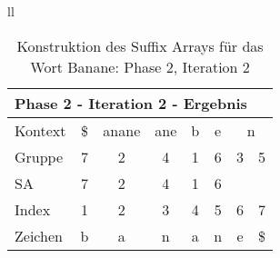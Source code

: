 \begin{table}[H]
\begin{adjustbox}{max width=\textwidth}
\begin{tabular}{ll}
\begin{tabular}{lccccccc}
\multicolumn{8}{l}{Phase 2 - Iteration 2 - Ergebnis}                                                                                                                                                             \\ \hline
\multicolumn{1}{l|}{Kontext} & \multicolumn{1}{c|}{\$} & \multicolumn{1}{c|}{anane} & \multicolumn{1}{c|}{ane} & \multicolumn{1}{c|}{b}                         & \multicolumn{1}{c|}{e} & \multicolumn{2}{c}{n} \\
\multicolumn{1}{l|}{Gruppe}  & \multicolumn{1}{c|}{7}  & \multicolumn{1}{c|}{2}     & \multicolumn{1}{c|}{4}   & \multicolumn{1}{c|}{1}                         & \multicolumn{1}{c|}{6} & 3         & 5          \\ 
\multicolumn{1}{l|}{SA}      & \multicolumn{1}{c|}{7}    & \multicolumn{1}{c|}{2}     & \multicolumn{1}{c|}{4}   &  \multicolumn{1}{c|}{\cellcolor[HTML]{\yellow}1}   & \multicolumn{1}{c|}{6} &           &            \\ \hline
\multicolumn{1}{l|}{Index}   & 1                       & 2                          & 3                        & 4                                              & 5                      & 6         & 7          \\
\multicolumn{1}{l|}{Zeichen} & b                       & a                          & n                        & a                                              & n                      & e         & \$        
\end{tabular}

\end{tabular}
\end{adjustbox}

\caption[Konstruktion des Suffix Arrays für das Wort Banane: Phase 2, Iteration 2]{Konstruktion des Suffix Arrays für das Wort Banane: Phase 2, Iteration 2}
\label{fig_banane_2_2} 
\end{table}
